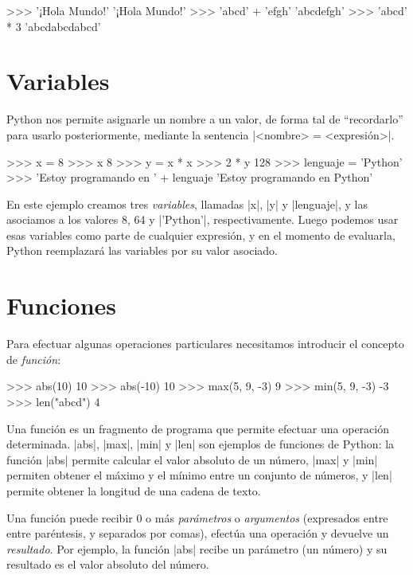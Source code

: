 \begin{codigo-python-sn}
>>> '¡Hola Mundo!'
'¡Hola Mundo!'
>>> 'abcd' + 'efgh'
'abcdefgh'
>>> 'abcd' * 3
'abcdabcdabcd'
\end{codigo-python-sn}

\section{Variables}

Python nos permite asignarle un nombre a un valor, de forma tal de
``recordarlo'' para usarlo posteriormente, mediante la sentencia
|<nombre> = <expresión>|.

\begin{codigo-python-sn}
>>> x = 8
>>> x
8
>>> y = x * x
>>> 2 * y
128
>>> lenguaje = 'Python'
>>> 'Estoy programando en ' + lenguaje
'Estoy programando en Python'
\end{codigo-python-sn}

En este ejemplo creamos tres \emph{variables}, llamadas |x|, |y| y |lenguaje|, y
las asociamos a los valores 8, 64 y |'Python'|, respectivamente. Luego podemos
usar esas variables como parte de cualquier expresión, y en el momento de
evaluarla, Python reemplazará las variables por su valor asociado.

\section{Funciones}

Para efectuar algunas operaciones particulares necesitamos introducir el
concepto de \emph{función}:

\begin{codigo-python-sn}
>>> abs(10)
10
>>> abs(-10)
10
>>> max(5, 9, -3)
9
>>> min(5, 9, -3)
-3
>>> len("abcd")
4
\end{codigo-python-sn}

Una función es un fragmento de programa que permite efectuar una operación
determinada.  |abs|, |max|, |min| y |len| son ejemplos de funciones de Python:
la función |abs| permite calcular el valor absoluto de un número, |max| y |min|
permiten obtener el máximo y el mínimo entre un conjunto de números, y |len|
permite obtener la longitud de una cadena de texto.

Una función puede recibir 0 o más \emph{parámetros} o \emph{argumentos}
(expresados entre entre paréntesis, y separados por comas), efectúa una
operación y devuelve un \emph{resultado}.  Por ejemplo, la función |abs| recibe
un parámetro (un número) y su resultado es el valor absoluto del número.

